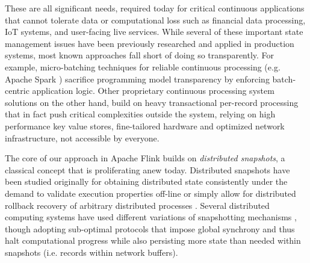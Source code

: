 These are all significant needs, required today for critical continuous applications that cannot tolerate data or computational loss such as financial data processing, IoT systems, and user-facing live services. 
While several of these important state management issues have been previously researched and applied in production systems, most known approaches fall short of doing so transparently. For example, micro-batching techniques for reliable continuous processing (e.g. Apache Spark \cite{zaharia2012discretized}) sacrifice programming model transparency by enforcing batch-centric application logic.
Other proprietary continuous processing system solutions \cite{millwheel} on the other hand, build on heavy transactional per-record processing that in fact push critical complexities outside the system, relying on high performance key value stores, fine-tailored hardware and optimized network infrastructure, not accessible by everyone. 


The core of our approach in Apache Flink builds on \emph{distributed snapshots}, a  classical concept that is proliferating anew today. Distributed snapshots have been studied originally for obtaining distributed state consistently under the demand to validate execution properties off-line or simply allow for distributed rollback recovery of arbitrary distributed processes \cite{elnozahy2002survey}. Several distributed computing systems have used different variations of snapshotting mechanisms \cite{murray2013naiad,low2012distributed}, though adopting sub-optimal protocols that impose global synchrony and thus halt computational progress while also persisting more state than needed within snapshots (i.e. records within network buffers).


